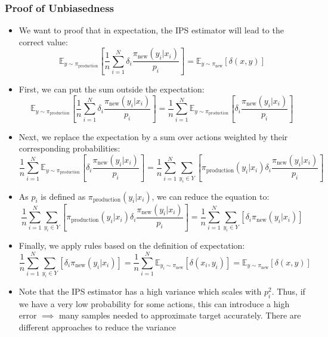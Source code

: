 \subsubsection{Proof of Unbiasedness}
\begin{itemize}
	\item We want to proof that in expectation, the IPS estimator will lead to the correct value: $$\mathbb{E}_{y\sim \pi_{\text{production}}}\left[\frac{1}{n}\sum\limits_{i=1}^{N} \delta_i \frac{\pi_{\text{new}}(y_i|x_i)}{p_i}\right] = \mathbb{E}_{y\sim \pi_{\text{new}}}\left[\delta(x,y)\right]$$
	\item First, we can put the sum outside the expectation:
	$$\mathbb{E}_{y\sim \pi_{\text{production}}}\left[\frac{1}{n}\sum\limits_{i=1}^{N} \delta_i \frac{\pi_{\text{new}}(y_i|x_i)}{p_i}\right] = \frac{1}{n}\sum\limits_{i=1}^{N} \mathbb{E}_{y\sim \pi_{\text{production}}}\left[\delta_i \frac{\pi_{\text{new}}(y_i|x_i)}{p_i}\right]$$
	\item Next, we replace the expectation by a sum over actions weighted by their corresponding probabilities:
	$$\frac{1}{n}\sum\limits_{i=1}^{N} \mathbb{E}_{y\sim \pi_{\text{production}}}\left[\delta_i \frac{\pi_{\text{new}}(y_i|x_i)}{p_i}\right] = \frac{1}{n}\sum\limits_{i=1}^{N} \sum\limits_{y_i\in Y}\left[\pi_{\text{production}}(y_i|x_i)\delta_i \frac{\pi_{\text{new}}(y_i|x_i)}{p_i}\right]$$
	\item As $p_i$ is defined as $\pi_{\text{production}}(y_i|x_i)$, we can reduce the equation to:
	$$\frac{1}{n}\sum\limits_{i=1}^{N} \sum\limits_{y_i\in Y}\left[\pi_{\text{production}}(y_i|x_i)\delta_i \frac{\pi_{\text{new}}(y_i|x_i)}{p_i}\right] = \frac{1}{n}\sum\limits_{i=1}^{N} \sum\limits_{y_i\in Y}\left[\delta_i \pi_{\text{new}}(y_i|x_i)\right]$$
	\item Finally, we apply rules based on the definition of expectation:
	$$\frac{1}{n}\sum\limits_{i=1}^{N} \sum\limits_{y_i\in Y}\left[\delta_i \pi_{\text{new}}(y_i|x_i)\right] = \frac{1}{n}\sum\limits_{i=1}^{N} \mathbb{E}_{y_i\sim \pi_{\text{new}}}\left[\delta(x_i,y_i)\right] = \mathbb{E}_{y\sim \pi_{\text{new}}}\left[\delta(x,y)\right]$$
	\item Note that the IPS estimator has a high variance which scales with $p_i^2$. Thus, if we have a very low probability for some actions, this can introduce a high error $\implies$ many samples needed to approximate target accurately. There are different approaches to reduce the variance
\end{itemize}
